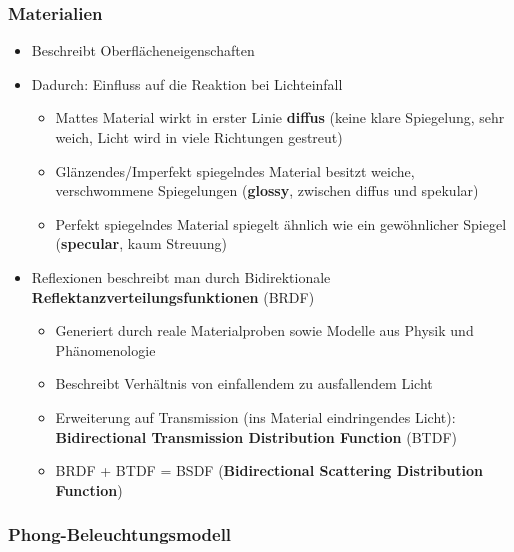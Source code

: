 \subsubsection{Materialien}%
\label{rt:ssub:materialien}

\begin{itemize}
	\item Beschreibt Oberflächeneigenschaften
	\item Dadurch: Einfluss auf die Reaktion bei Lichteinfall
	\begin{itemize}
		\item Mattes Material wirkt in erster Linie \textbf{diffus} (keine klare Spiegelung, sehr weich, Licht wird in viele Richtungen gestreut)
		\item Glänzendes/Imperfekt spiegelndes Material besitzt weiche, verschwommene Spiegelungen (\textbf{\glqq glossy\grqq}, zwischen diffus und spekular)
		\item Perfekt spiegelndes Material spiegelt ähnlich wie ein gewöhnlicher Spiegel (\textbf{\glqq specular\grqq}, kaum Streuung)
	\end{itemize}
	\item Reflexionen beschreibt man durch Bidirektionale \textbf{Reflektanzverteilungsfunktionen} (BRDF)
	\begin{itemize}
		\item Generiert durch reale Materialproben sowie Modelle aus Physik und Phänomenologie
		\item Beschreibt Verhältnis von einfallendem zu ausfallendem Licht
		\item Erweiterung auf Transmission (ins Material eindringendes Licht): \textbf{Bidirectional Transmission Distribution Function} (BTDF)
		\item BRDF + BTDF = BSDF (\textbf{Bidirectional Scattering Distribution Function})
	\end{itemize}
\end{itemize}

\subsubsection{Phong-Beleuchtungsmodell}%
\label{rt:ssub:phong_beleuchtungsmodell}

